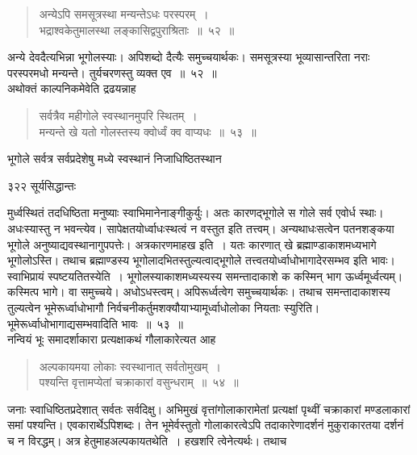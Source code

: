 \documentclass[11pt, openany]{book}
\begin{document}
\begin{quote}
 {\ssi अन्येऽपि समसूत्रस्था मन्यन्तेऽधः परस्परम्~।\\
भद्राश्वकेतुमालस्था लङ्कासिद्वपुराश्रिताः~॥~५२~॥}
\end{quote}

 अन्ये देवदैत्यभिन्ना भूगोलस्याः। अपिशब्दो दैत्यैः समुच्चयार्थकः। समसूत्रस्या भूव्यासान्तरिता नराः परस्परमधो मन्यन्ते। तुर्यचरणस्तु व्यक्त एव~॥~५२~॥\\ 
अथोक्तं काल्पनिकमेवेति द्रढयन्नाह\textendash 


\begin{quote}
 {\ssi सर्वत्रैव महीगोले स्वस्थानमुपरि स्थितम्~।\\
मन्यन्ते खे यतो गोलस्तस्य क्वोर्ध्वं क्व वाप्यधः~॥~५३~॥}
\end{quote}

 भूगोले सर्वत्र सर्वप्रदेशेषु मध्ये स्वस्थानं निजाधिष्ठितस्थान\textendash



\newpage


\noindent ३२२ \hspace{3cm} सूर्यसिद्धान्तः
\vspace{1cm}


\noindent मुर्ध्वस्थितं तदधिष्ठिता मनुष्याः स्वाभिमानेनाङ्गीकुर्युः। अतः कारणद्भूगोले स गोले सर्व एवोर्ध स्थाः। अधःस्यास्तु न भवन्त्येव। सापेक्षतयोर्ध्वाधःस्थत्वं न वस्तुत इति तत्त्वम्। अन्यथाधःसत्वेन पतनशङ्कया भूगोले अनुष्याद्यवस्थानागुपपत्तेः। अत्रकारणमाह\textendash ख इति~। यतः कारणात् खे ब्रह्माण्डाकाशमध्यभागे भूगोलोऽस्ति। तथाच ब्रह्माण्डस्य भूगोलादभितस्तुल्यत्वाद्भूगोले तत्त्वतयोर्ध्वाधोभागादेरसम्भव इति भावः। स्वाभिप्रायं स्पष्टयति\textendash तस्येति~। भूगोलस्याकाशमध्यस्यस्य समन्तादाकाशे क कस्मिन् भाग ऊर्ध्वमूर्ध्वत्यम्। कस्मित्प भागे। वा समुच्चये। अधोऽधस्त्वम्। अपिरूर्ध्वत्वेग समुच्चयार्थकः। तथाच समन्तादाकाशस्य तुल्यत्वेन भूमेरूर्ध्वाधोभागौ निर्वचनीकर्तुमशक्यौयाभ्यामूर्ध्वाधोलोका नियताः स्युरिति। भूमेरूर्ध्वाधोभागाद्यसम्भवादिति भावः~॥~५३~॥ \\
\noindent नन्वियं भूः समादर्शाकारा प्रत्यक्षाकथं गौलाकारेत्यत आह \textendash


\begin{quote}
{\ssi अल्पकायमया लोकाः स्वस्थानात् सर्वतोमुखम्~।\\
पश्यन्ति वृत्तामप्येतां चक्राकारां वसुन्धराम्~॥~५४~॥}
\end{quote}
 जनाः स्वाधिष्ठितप्रदेशात् सर्वतः सर्वदिक्षु। अभिमुखं वृत्तांगोलाकारामेतां प्रत्यक्षां पृथ्वीं चक्राकारां मण्डलाकारां समां पश्यन्ति। एवकारार्थेऽपिशब्दः। तेन भूमेर्वस्तुतो गोलाकारत्वेऽपि तदाकारेणादर्शनं मुकुराकारतया दर्शनं च न विरद्धम्। अत्र हेतुमाह\textendash अल्पकायतथेति~। हखशरि त्वेनेत्यर्थः। तथाच \textendash
\end{document}
